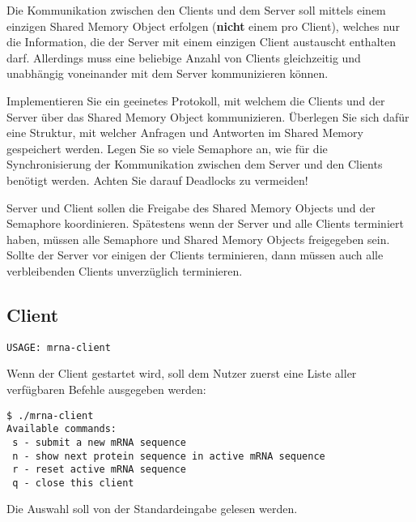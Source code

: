 Die Kommunikation zwischen den Clients und dem Server soll mittels einem
einzigen Shared Memory Object erfolgen (\textbf{nicht} einem pro Client),
welches nur die Information, die der Server mit einem einzigen Client
austauscht enthalten darf.  Allerdings muss eine beliebige Anzahl von Clients
gleichzeitig und unabhängig voneinander mit dem Server kommunizieren können.

Implementieren Sie ein geeinetes Protokoll, mit welchem die Clients und der
Server über das Shared Memory Object kommunizieren. Überlegen Sie sich dafür
eine Struktur, mit welcher Anfragen und Antworten im Shared Memory gespeichert
werden. Legen Sie so viele Semaphore an, wie für die Synchronisierung der
Kommunikation zwischen dem Server und den Clients benötigt werden. Achten Sie
darauf Deadlocks zu vermeiden!

Server und Client sollen die Freigabe des Shared Memory Objects und der
Semaphore koordinieren. Spätestens wenn der Server und alle Clients terminiert
haben, müssen alle Semaphore und Shared Memory Objects freigegeben sein.
Sollte der Server vor einigen der Clients terminieren, dann müssen auch alle
verbleibenden Clients unverzüglich terminieren.

\subsection*{Client}

\begin{verbatim}
USAGE: mrna-client
\end{verbatim}

Wenn der Client gestartet wird, soll dem Nutzer zuerst eine Liste aller
verfügbaren Befehle ausgegeben werden:

\begin{verbatim}
$ ./mrna-client
Available commands:
 s - submit a new mRNA sequence
 n - show next protein sequence in active mRNA sequence
 r - reset active mRNA sequence
 q - close this client
\end{verbatim}

Die Auswahl soll von der Standardeingabe gelesen werden.

